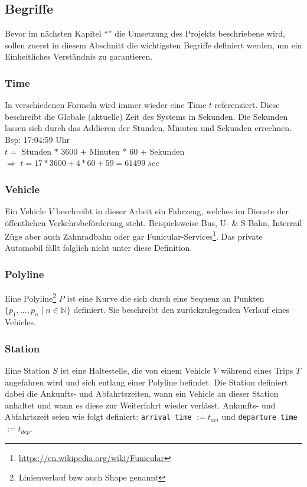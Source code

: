 \subsection{Begriffe}
\label{sub:begriffe}
  Bevor im nächsten Kapitel "`"' die Umsetzung des Projekts beschriebene wird, sollen zuerst in diesem Abschnitt die wichtigsten Begriffe definiert werden, um ein Einheitliches Verständnis zu garantieren.

  \subsubsection{Time}
  \label{ssub:time}
    In verschiedenen Formeln wird immer wieder eine Time $t$ referenziert. Diese beschreibt die Globale (aktuelle) Zeit des Systems in Sekunden. 
    Die Sekunden lassen sich durch das Addieren der Stunden, Minuten und Sekunden errechnen.\\

    Bsp: 17:04:59 Uhr\\

    $t = $ Stunden $*$ 3600 $+$ Minuten $*$ 60 $+$ Sekunden\\
    $\Rightarrow$ $t = 17 * 3600 + 4 * 60 + 59 = 61499 \; sec$
    

  \subsubsection{Vehicle}
  \label{ssub:vehicle}
    Ein Vehicle $V$ beschreibt in dieser Arbeit ein Fahrzeug, welches im Dienste der öffentlichen Verkehrsbeförderung steht. Beispielsweise Bus, U- \& S-Bahn, Interrail Züge aber auch Zahnradbahn oder gar Funicular-Services\footnote{\url{https://en.wikipedia.org/wiki/Funicular}}. Das private Automobil fällt folglich nicht unter diese Definition.

  \subsubsection{Polyline}
  \label{ssub:polyline}
    Eine Polyline\footnote{Linienverlauf bzw auch Shape genannt} $P$ ist eine Kurve die sich durch eine Sequenz an Punkten $\{ p_1, \dotsc, p_n \;|\; n \in \mathbb{N} \}$ definiert. Sie beschreibt den zurückzulegenden Verlauf eines Vehicles.

  \subsubsection{Station}
  \label{ssub:station}
    Eine Station $S$ ist eine Haltestelle, die von einem Vehicle $V$ während eines Trips $T$ angefahren wird und sich entlang einer Polyline befindet. Die Station definiert dabei die Ankunfts- und Abfahrtszeiten, wann ein Vehicle an dieser Station anhaltet und wann es diese zur Weiterfahrt wieder verlässt. Ankunfts- und Abfahrtszeit seien wie folgt definiert: \texttt{arrival time} $ := t_{ari}$ und \texttt{departure time} $ := t_{dep}$.

